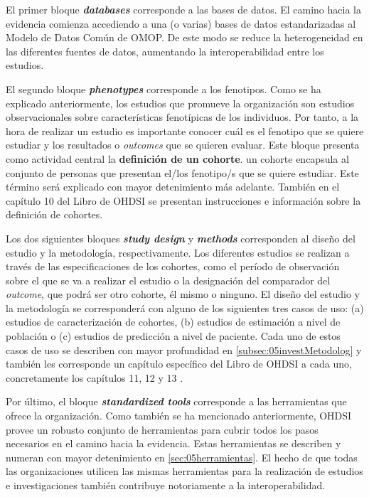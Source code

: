 El primer bloque \textbf{\textit{databases}} corresponde a las bases de datos. El camino hacia la evidencia comienza accediendo a una (o varias) bases de datos estandarizadas al Modelo de Datos Común de OMOP. De este modo se reduce la heterogeneidad en las diferentes fuentes de datos, aumentando la interoperabilidad entre los estudios. 

El segundo bloque\textbf{ \textit{phenotypes}} corresponde a los fenotipos. Como se ha explicado anteriormente, los estudios que promueve la organización son estudios observacionales sobre características fenotípicas de los individuos. Por tanto, a la hora de realizar un estudio es importante conocer cuál es el fenotipo que se quiere estudiar y los resultados o \textit{outcomes} que se quieren evaluar. Este bloque presenta como actividad central la \textbf{definición de un cohorte}. un cohorte encapsula al conjunto de personas que presentan el/los fenotipo/s que se quiere estudiar. Este término será explicado con mayor detenimiento más adelante. También en el capítulo 10 del Libro de OHDSI \cite{OHDSIbook} se presentan instrucciones e información sobre la definición de cohortes.

Los dos siguientes bloques \textbf{\textit{study design}} y \textbf{\textit{methods}} corresponden al diseño del estudio y la metodología, respectivamente. Los diferentes estudios se realizan a través de las especificaciones de los cohortes, como el período de observación sobre el que se va a realizar el estudio o la designación del comparador del \textit{outcome}, que podrá ser otro cohorte, él mismo o ninguno. El diseño del estudio y la metodología se corresponderá con alguno de los siguientes tres casos de uso: (a) estudios de caracterización de cohortes, (b) estudios de estimación a nivel de población o (c) estudios de predicción a nivel de paciente. Cada uno de estos casos de uso se describen con mayor profundidad en \ref{subsec:05investMetodolog} y también les corresponde un capítulo específico del Libro de OHDSI a cada uno, concretamente los capítulos 11, 12 y 13 \cite{OHDSIbook}.

Por último, el bloque \textbf{\textit{standardized tools}} corresponde a las herramientas que ofrece la organización. Como también se ha mencionado anteriormente, OHDSI provee un robusto conjunto de herramientas para cubrir todos los pasos necesarios en el camino hacia la evidencia. Estas herramientas se describen y numeran con mayor detenimiento en \ref{sec:05herramientas}. El hecho de que todas las organizaciones utilicen las mismas herramientas para la realización de estudios e investigaciones también contribuye notoriamente a la interoperabilidad. 

